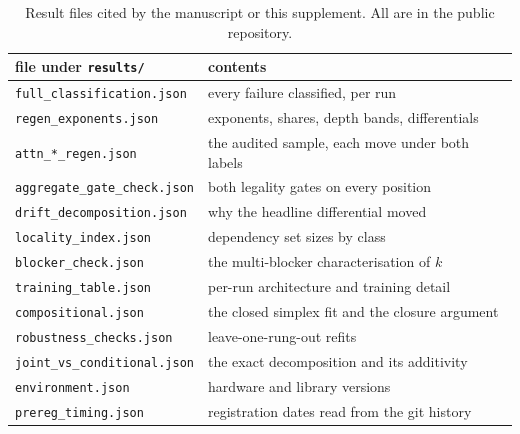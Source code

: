 \documentclass[11pt]{article}
\begin{document}
\begin{table}[htbp]
\centering\small
\caption{Result files cited by the manuscript or this supplement. All are in the public repository.}
\label{tab:s-artifacts}
\begin{tabular}{ll}
\toprule
file under \texttt{results/} & contents \\
\midrule
\texttt{full\_classification.json} & every failure classified, per run \\
\texttt{regen\_exponents.json} & exponents, shares, depth bands, differentials \\
\texttt{attn\_*\_regen.json} & the audited sample, each move under both labels \\
\texttt{aggregate\_gate\_check.json} & both legality gates on every position \\
\texttt{drift\_decomposition.json} & why the headline differential moved \\
\texttt{locality\_index.json} & dependency set sizes by class \\
\texttt{blocker\_check.json} & the multi-blocker characterisation of $k$ \\
\texttt{training\_table.json} & per-run architecture and training detail \\
\texttt{compositional.json} & the closed simplex fit and the closure argument \\
\texttt{robustness\_checks.json} & leave-one-rung-out refits \\
\texttt{joint\_vs\_conditional.json} & the exact decomposition and its additivity \\
\texttt{environment.json} & hardware and library versions \\
\texttt{prereg\_timing.json} & registration dates read from the git history \\
\bottomrule
\end{tabular}
\end{table}
\end{document}
